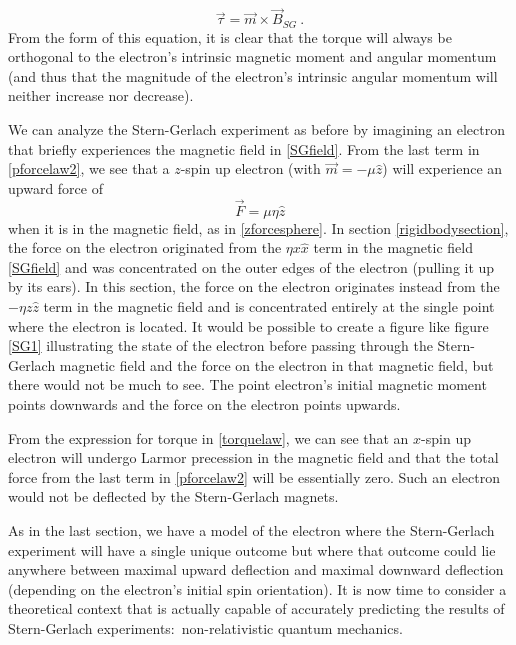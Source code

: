 \documentclass[onecolumn,secnumarabic,amsmath,amssymb,balancelastpage,nofootinbib]{article}
\begin{document}
\begin{equation}
\vec{\tau}= \vec{m}\times\vec{B}_{SG}
\ .
\label{torquelaw}
\end{equation}
From the form of this equation, it is clear that the torque will always be orthogonal to the electron's intrinsic magnetic moment and angular momentum (and thus that the magnitude of the electron's intrinsic angular momentum will neither increase nor decrease).

We can analyze the Stern-Gerlach experiment as before by imagining an electron that briefly experiences the magnetic field in \eqref{SGfield}.  From the last term in \eqref{pforcelaw2}, we see that a $z$-spin up electron (with $\vec{m}=-\mu\hat{z}$) will experience an upward force of
\begin{equation}
\vec{F}=\mu \eta \hat{z}
\label{zforcepoint}
\end{equation}
when it is in the magnetic field, as in \eqref{zforcesphere}.  In section \ref{rigidbodysection}, the force on the electron originated from the $\eta x \hat{x}$ term in the magnetic field \eqref{SGfield} and was concentrated on the outer edges of the electron (pulling it up by its ears).  In this section, the force on the electron originates instead from the $- \eta z\hat{z}$ term in the magnetic field and is concentrated entirely at the single point where the electron is located.  It would be possible to create a figure like figure \ref{SG1} illustrating the state of the electron before passing through the Stern-Gerlach magnetic field and the force on the electron in that magnetic field, but there would not be much to see.  The point electron's initial magnetic moment points downwards and the force on the electron points upwards.

From the expression for torque in \eqref{torquelaw}, we can see that an $x$-spin up electron will undergo Larmor precession in the magnetic field and that the total force from the last term in \eqref{pforcelaw2} will be essentially zero.  Such an electron would not be deflected by the Stern-Gerlach magnets.

As in the last section, we have a model of the electron where the Stern-Gerlach experiment will have a single unique outcome but where that outcome could lie anywhere between maximal upward deflection and maximal downward deflection (depending on the electron's initial spin orientation).  It is now time to consider a theoretical context that is actually capable of accurately predicting the results of Stern-Gerlach experiments:\ non-relativistic quantum mechanics.
\end{document}

